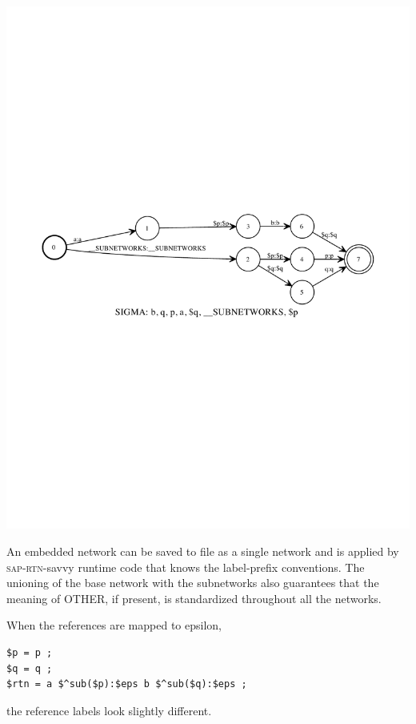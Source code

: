 \documentclass[letterpaper,12pt]{article}
\newcommand{\acro}{\textsc}
\begin{document}
\begin{center}
\includegraphics[width=\textwidth]{images/sapEmbedded.pdf}
\end{center}

\noindent
An embedded network can be saved to file as a single network and is
applied by \acro{sap}-\acro{rtn}-savvy runtime code that knows the label-prefix
conventions.  
The unioning of the base network with the subnetworks also guarantees that
the meaning of OTHER, if present, is standardized throughout all the
networks.

When the references are mapped to epsilon, 

\begin{Verbatim}[fontsize=\small]
$p = p ;
$q = q ;
$rtn = a $^sub($p):$eps b $^sub($q):$eps ;
\end{Verbatim}

\noindent
the reference labels look slightly different.
\end{document}
